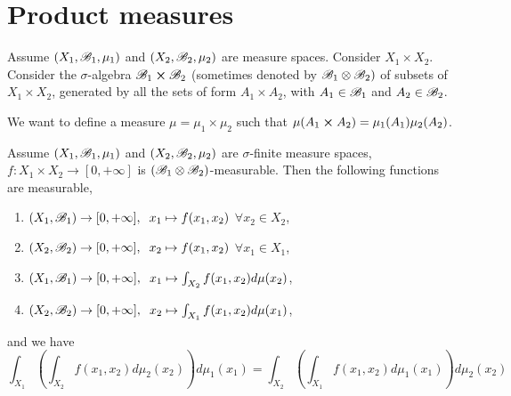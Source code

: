 \section{Product measures}
Assume $(X_1,\mathscr{B}_1,\mu_1)$ and $(X_2,\mathscr{B}_2,\mu_2)$ are measure spaces. Consider $X_1\times X_2$. Consider the $\sigma$-algebra $\mathscr{B}_1\cross \mathscr{B}_2$ 
(sometimes denoted by $\mathscr{B}_1\otimes \mathscr{B}_2)$ of subsets of $X_1\times X_2$, generated by all the sets of form $A_1\times A_2$, with $A_1\in\mathscr{B}_1 $ and $A_2\in \mathscr{B}_2$.


We want to define a measure $\mu = \mu_1\times \mu_2$ such that $\mu(A_1\cross A_2) = \mu_1(A_1)\mu_2(A_2)$.

\begin{theorem}
    Assume $(X_1,\mathscr{B}_1,\mu_1)$ and $(X_2,\mathscr{B}_2,\mu_2)$ are $\sigma$-finite measure spaces, $f:X_1\times X_2\rightarrow [0,+\infty]$ is $(\mathscr{B}_1\otimes \mathscr{B}_2)$-measurable.
    Then the following functions are measurable, 
    
    \begin{enumerate}
        \item $(X_1,\mathscr{B}_1)\rightarrow [0,+\infty],\hspace{2mm} x_1\mapsto f(x_1,x_2)$ $\forall x_2\in X_2$,
        \item $(X_2,\mathscr{B}_2)\rightarrow [0,+\infty],\hspace{2mm} x_2\mapsto f(x_1,x_2)$ $\forall x_1\in X_1$,
        \item $(X_1,\mathscr{B}_1)\rightarrow [0,+\infty],\hspace{2mm} x_1\mapsto \int_{X_2} f(x_1,x_2)d\mu(x_2)$,
        \item $(X_2,\mathscr{B}_2)\rightarrow [0,+\infty],\hspace{2mm} x_2\mapsto \int_{X_1} f(x_1,x_2)d\mu(x_1)$,
    \end{enumerate}
    and we have \[\int_{X_1}\left(\int_{X_2}f(x_1,x_2)d\mu_2(x_2)\right)d\mu_1(x_1)= \int_{X_2}\left(\int_{X_1}f(x_1,x_2)d\mu_1(x_1)\right)d\mu_2(x_2)\]
\end{theorem}

